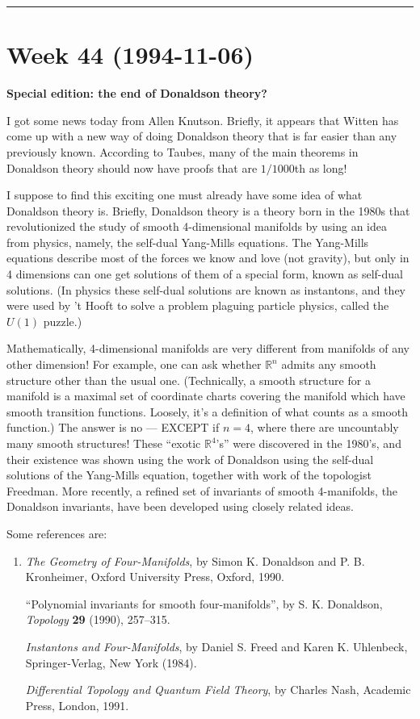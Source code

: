 \documentclass{article}
\begin{document}
\begin{center}\rule{0.5\linewidth}{0.5pt}\end{center}
\hypertarget{week44}{%
\section{Week 44 (1994-11-06)}\label{week44}}

\textbf{Special edition: the end of Donaldson theory?}

I got some news today from Allen Knutson. Briefly, it appears that
Witten has come up with a new way of doing Donaldson theory that is far
easier than any previously known. According to Taubes, many of the main
theorems in Donaldson theory should now have proofs that are
\(1/1000\)th as long!

I suppose to find this exciting one must already have some idea of what
Donaldson theory is. Briefly, Donaldson theory is a theory born in the
1980s that revolutionized the study of smooth 4-dimensional manifolds by
using an idea from physics, namely, the self-dual Yang-Mills equations.
The Yang-Mills equations describe most of the forces we know and love
(not gravity), but only in 4 dimensions can one get solutions of them of
a special form, known as self-dual solutions. (In physics these
self-dual solutions are known as instantons, and they were used by 't
Hooft to solve a problem plaguing particle physics, called the \(U(1)\)
puzzle.)

Mathematically, 4-dimensional manifolds are very different from
manifolds of any other dimension! For example, one can ask whether
\(\mathbb{R}^n\) admits any smooth structure other than the usual one.
(Technically, a smooth structure for a manifold is a maximal set of
coordinate charts covering the manifold which have smooth transition
functions. Loosely, it's a definition of what counts as a smooth
function.) The answer is no --- EXCEPT if \(n = 4\), where there are
uncountably many smooth structures! These ``exotic \(\mathbb{R}^4\)'s''
were discovered in the 1980's, and their existence was shown using the
work of Donaldson using the self-dual solutions of the Yang-Mills
equation, together with work of the topologist Freedman. More recently,
a refined set of invariants of smooth 4-manifolds, the Donaldson
invariants, have been developed using closely related ideas.

Some references are:

\begin{enumerate}
\def\labelenumi{\arabic{enumi})}
\item
  \emph{The Geometry of Four-Manifolds}, by Simon K. Donaldson and P. B.
  Kronheimer, Oxford University Press, Oxford, 1990.

  ``Polynomial invariants for smooth four-manifolds'', by S. K.
  Donaldson, \emph{Topology} \textbf{29} (1990), 257--315.

  \emph{Instantons and Four-Manifolds}, by Daniel S. Freed and Karen K.
  Uhlenbeck, Springer-Verlag, New York (1984).

  \emph{Differential Topology and Quantum Field Theory}, by Charles
  Nash, Academic Press, London, 1991.
\end{enumerate}
\end{document}
